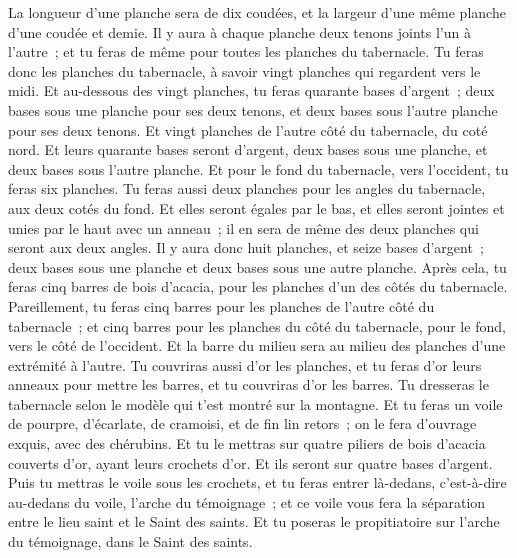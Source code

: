 \begin{multicols}{2}
La longueur d'une planche sera de dix coudées, et la largeur d'une même planche d'une coudée et demie.
Il y aura à chaque planche deux tenons joints l'un à l'autre~; et tu feras de même pour toutes les planches du tabernacle.
Tu feras donc les planches du tabernacle, à savoir vingt planches qui regardent vers le midi.
Et au-dessous des vingt planches, tu feras quarante bases d'argent~; deux bases sous une planche pour ses deux tenons, et deux bases sous l'autre planche pour ses deux tenons.
Et vingt planches de l'autre côté du tabernacle, du coté nord.
Et leurs quarante bases seront d'argent, deux bases sous une planche, et deux bases sous l'autre planche.
Et pour le fond du tabernacle, vers l'occident, tu feras six planches.
Tu feras aussi deux planches pour les angles du tabernacle, aux deux cotés du fond.
Et elles seront égales par le bas, et elles seront jointes et unies par le haut avec un anneau~; il en sera de même des deux planches qui seront aux deux angles.
Il y aura donc huit planches, et seize bases d'argent~; deux bases sous une planche et deux bases sous une autre planche.
Après cela, tu feras cinq barres de bois d'acacia, pour les planches d'un des côtés du tabernacle.
Pareillement, tu feras cinq barres pour les planches de l'autre côté du tabernacle~; et cinq barres pour les planches du côté du tabernacle, pour le fond, vers le côté de l'occident.
Et la barre du milieu sera au milieu des planches d'une extrémité à l'autre.
Tu couvriras aussi d'or les planches, et tu feras d'or leurs anneaux pour mettre les barres, et tu couvriras d'or les barres.
Tu dresseras le tabernacle selon le modèle qui t'est montré sur la montagne.
Et tu feras un voile de pourpre, d'écarlate, de cramoisi, et de fin lin retors~; on le fera d'ouvrage exquis, avec des chérubins.
Et tu le mettras sur quatre piliers de bois d'acacia couverts d'or, ayant leurs crochets d'or. Et ils seront sur quatre bases d'argent.
Puis tu mettras le voile sous les crochets, et tu feras entrer là-dedans, c'est-à-dire au-dedans du voile, l'arche du témoignage~; et ce voile vous fera la séparation entre le lieu saint et le Saint des saints.
Et tu poseras le propitiatoire sur l'arche du témoignage, dans le Saint des saints.

\end{multicols}
